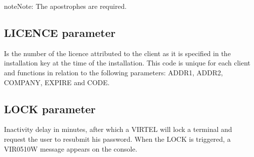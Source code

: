 \documentclass[letterpaper,10pt,english]{sphinxmanual}
\begin{document}
\begin{sphinxadmonition}{note}{Note:}
\sphinxAtStartPar
The apostrophes are required.
\end{sphinxadmonition}

\ignorespaces 

\subsection{LICENCE parameter}
\label{\detokenize{Installation_Guide:licence-parameter}}\label{\detokenize{Installation_Guide:index-85}}
\begin{sphinxVerbatim}[commandchars=\\\{\}]
                          
\end{sphinxVerbatim}

\sphinxAtStartPar
Is the number of the licence attributed to the client as it is specified in the installation key at the time of the installation. This code is unique for each client and functions in relation to the following parameters: ADDR1, ADDR2, COMPANY, EXPIRE and CODE.

\ignorespaces 

\subsection{LOCK parameter}
\label{\detokenize{Installation_Guide:lock-parameter}}\label{\detokenize{Installation_Guide:index-86}}
\begin{sphinxVerbatim}[commandchars=\\\{\}]
                               
\end{sphinxVerbatim}

\sphinxAtStartPar
{} \sphinxhyphen{} Inactivity delay in minutes, after which a VIRTEL will lock a terminal and request the user to resubmit his password. When the LOCK is triggered, a VIR0510W message appears on the console.
\end{document}
